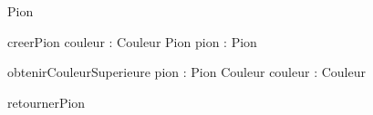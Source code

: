 \begin{algorithme}

  \begin{enregistrement}{Pion}
  \end{enregistrement}

  \vspace*{5mm} 
  
  \fonction
      {creerPion}
      {couleur : Couleur}
      {Pion}
      {pion : Pion}
      {{}

       {}}

  \vspace*{5mm} 
      
  \fonction
      {obtenirCouleurSuperieure}
      {pion : Pion}
      {Couleur}
      {couleur : Couleur}
      {}

  \vspace*{5mm} 
      
  \procedure
      {retournerPion}
      {}
      {}
      {}

\end{algorithme}
